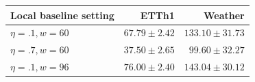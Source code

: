 \begin{tabular}{lrr}
\toprule
Local baseline setting & ETTh1 & Weather \\
\midrule
$\eta=.1, w=60$ & $67.79\pm2.42$ & $133.10\pm31.73$ \\
$\eta=.7, w=60$ & $37.50\pm2.65$ & $99.60\pm32.27$ \\
$\eta=.1, w=96$ & $76.00\pm2.40$ & $143.04\pm30.12$ \\
\bottomrule
\end{tabular}
